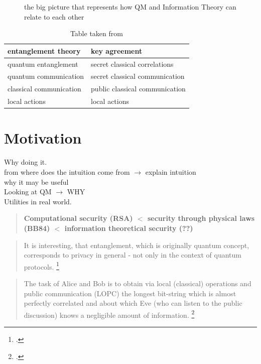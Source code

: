 

	\begin{figure}[H]
		\centering
		
		\caption{the big picture that represents how QM and Information Theory can relate to each other}
	\end{figure}
	\begin{table}[ht]
	 \centering
	 	\begin{tabular}{ l | l}
	 		\textbf{entanglement theory} & \textbf{key agreement} \\ 
	 		\hline 
	 		quantum entanglement & secret classical correlations \\ 
	 		quantum communication & secret classical communication \\ 
	 		classical communication & public classical communication \\ 
	 		local actions & local actions \\ 
	 	\end{tabular} 
	 	\caption{Table taken from \cite{4H07}}
	 \end{table}
	
	
	\section{Motivation}
	Why doing it. \\
	from where does the intuition come from $\rightarrow$ explain intuition\\
	why it may be useful\\
	Looking at QM $\rightarrow$ WHY\\
	Utilities in real world.\\
	
	\begin{quote}
	\textbf{Computational security (RSA) $<$ security through physical laws (BB84) $<$ information theoretical security (??)}
	\end{quote}
	
	\begin{quotation}
	It is interesting, that entanglement, which is originally quantum concept, corresponds to privacy in general - not only in the context of quantum protocols.
	\footcite{4H07}
	\end{quotation}
	\begin{quotation}
	The task of Alice and Bob is to obtain via local (classical) operations and public communication (LOPC) the longest bit-string which is almost perfectly correlated and about which Eve (who can listen to the public discussion) knows a negligible amount of information.
	\footcite{4H07}
	\end{quotation}		
	
